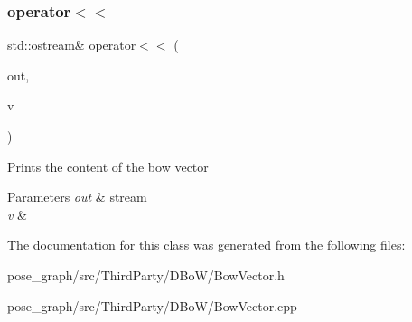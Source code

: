\subsubsection{\texorpdfstring{operator$<$$<$}{operator<<}}
{\footnotesize\ttfamily std\+::ostream\& operator$<$$<$ (\begin{DoxyParamCaption}\item[{std\+::ostream \&}]{out,  }\item[{const \hyperlink{classDBoW2_1_1BowVector}{Bow\+Vector} \&}]{v }\end{DoxyParamCaption})\hspace{0.3cm}{\ttfamily [friend]}}

Prints the content of the bow vector 
\begin{DoxyParams}{Parameters}
{\em out} & stream \\
\hline
{\em v} & \\
\hline
\end{DoxyParams}


The documentation for this class was generated from the following files\+:\begin{DoxyCompactItemize}
\item 
pose\+\_\+graph/src/\+Third\+Party/\+D\+Bo\+W/Bow\+Vector.\+h\item 
pose\+\_\+graph/src/\+Third\+Party/\+D\+Bo\+W/Bow\+Vector.\+cpp\end{DoxyCompactItemize}

